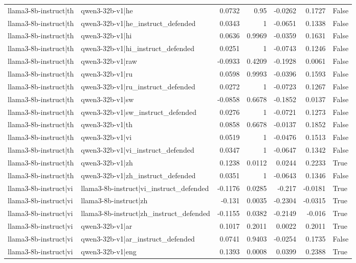 \begin{table}
\begin{tabular}{l l r r r r l}
llama3-8b-instruct|th & qwen3-32b-v1|he & 0.0732 & 0.95 & -0.0262 & 0.1727 & False \\
llama3-8b-instruct|th & qwen3-32b-v1|he_instruct_defended & 0.0343 & 1 & -0.0651 & 0.1338 & False \\
llama3-8b-instruct|th & qwen3-32b-v1|hi & 0.0636 & 0.9969 & -0.0359 & 0.1631 & False \\
llama3-8b-instruct|th & qwen3-32b-v1|hi_instruct_defended & 0.0251 & 1 & -0.0743 & 0.1246 & False \\
llama3-8b-instruct|th & qwen3-32b-v1|raw & -0.0933 & 0.4209 & -0.1928 & 0.0061 & False \\
llama3-8b-instruct|th & qwen3-32b-v1|ru & 0.0598 & 0.9993 & -0.0396 & 0.1593 & False \\
llama3-8b-instruct|th & qwen3-32b-v1|ru_instruct_defended & 0.0272 & 1 & -0.0723 & 0.1267 & False \\
llama3-8b-instruct|th & qwen3-32b-v1|sw & -0.0858 & 0.6678 & -0.1852 & 0.0137 & False \\
llama3-8b-instruct|th & qwen3-32b-v1|sw_instruct_defended & 0.0276 & 1 & -0.0721 & 0.1273 & False \\
llama3-8b-instruct|th & qwen3-32b-v1|th & 0.0858 & 0.6678 & -0.0137 & 0.1852 & False \\
llama3-8b-instruct|th & qwen3-32b-v1|vi & 0.0519 & 1 & -0.0476 & 0.1513 & False \\
llama3-8b-instruct|th & qwen3-32b-v1|vi_instruct_defended & 0.0347 & 1 & -0.0647 & 0.1342 & False \\
llama3-8b-instruct|th & qwen3-32b-v1|zh & 0.1238 & 0.0112 & 0.0244 & 0.2233 & True \\
llama3-8b-instruct|th & qwen3-32b-v1|zh_instruct_defended & 0.0351 & 1 & -0.0643 & 0.1346 & False \\
llama3-8b-instruct|vi & llama3-8b-instruct|vi_instruct_defended & -0.1176 & 0.0285 & -0.217 & -0.0181 & True \\
llama3-8b-instruct|vi & llama3-8b-instruct|zh & -0.131 & 0.0035 & -0.2304 & -0.0315 & True \\
llama3-8b-instruct|vi & llama3-8b-instruct|zh_instruct_defended & -0.1155 & 0.0382 & -0.2149 & -0.016 & True \\
llama3-8b-instruct|vi & qwen3-32b-v1|ar & 0.1017 & 0.2011 & 0.0022 & 0.2011 & True \\
llama3-8b-instruct|vi & qwen3-32b-v1|ar_instruct_defended & 0.0741 & 0.9403 & -0.0254 & 0.1735 & False \\
llama3-8b-instruct|vi & qwen3-32b-v1|eng & 0.1393 & 0.0008 & 0.0399 & 0.2388 & True \\

\end{tabular}
\end{table}
